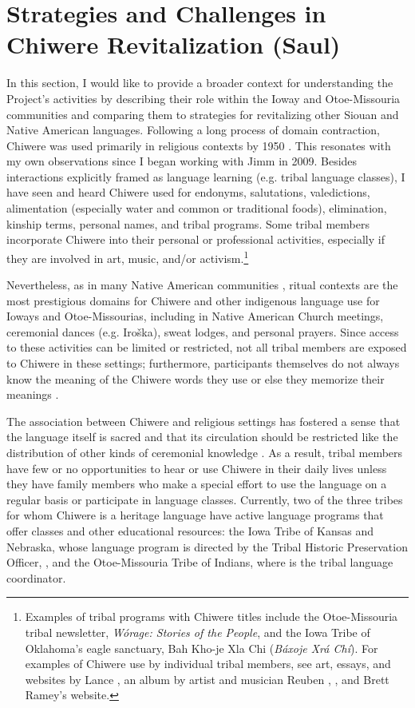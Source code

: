 \documentclass[output=paper]{LSP/langsci}
\begin{document}
\section{Strategies and Challenges in Chiwere Revitalization (Saul)}\label{saul}
In this section, I would like to provide a broader context for understanding the Project's activities by describing their role within the Ioway and Otoe-Missouria communities and comparing them to strategies for revitalizing other Siouan and Native American languages. Following a long process of domain contraction, Chiwere was used primarily in religious contexts by 1950 \citep{Davidson1997, FurbeeStanley1996, FurbeeStanley2002}. This resonates with my own observations since I began working with Jimm in 2009. Besides interactions explicitly framed as language learning (e.g. tribal language classes), I have seen and heard Chiwere used for endonyms, salutations, valedictions, alimentation (especially water and common or traditional foods), elimination, kinship terms, personal names, and tribal programs. Some tribal members incorporate Chiwere into their personal or professional activities, especially if they are involved in art, music, and/or activism.\footnote{Examples of tribal programs with Chiwere titles include the Otoe-Missouria tribal newsletter, \emph{W\'orage: Stories of the People}, and the Iowa Tribe of Oklahoma's eagle sanctuary, Bah Kho-je Xla Chi (\emph{B\'axoje Xr\'a Ch\'i}). For examples of Chiwere use by individual tribal members, see art, essays, and websites by Lance \citet{Foster1989, Foster1996, Foster1999, Foster2009, FosterNDa, FosterNDb, FosterNDc}, an album by artist and musician Reuben \citet{Kent2004}, \citet{Jones2004}, and Brett Ramey's \citeyearpar{RameyND} website.} 

Nevertheless, as in many Native American communities \citep[see e.g.][]{Kroskrity1998}, ritual contexts are the most prestigious domains for Chiwere and other indigenous language use for Ioways and Otoe-Missourias, including in Native American Church meetings, ceremonial dances (e.g. Iro\v{s}ka), sweat lodges, and personal prayers. Since access to these activities can be limited or restricted, not all tribal members are exposed to Chiwere in these settings; furthermore, participants themselves do not always know the meaning of the Chiwere words they use or else they memorize their meanings \citep[see e.g.][520--521]{Davidson1997}.

The association between Chiwere and religious settings has fostered a sense that the language itself is sacred and that its circulation should be restricted like the distribution of other kinds of ceremonial knowledge \citep{Davidson1997}. As a result, tribal members have few or no opportunities to hear or use Chiwere in their daily lives unless they have family members who make a special effort to use the language on a regular basis or participate in language classes. Currently, two of the three tribes for whom Chiwere is a heritage language have active language programs that offer classes and other educational resources: the Iowa Tribe of Kansas and Nebraska, whose language program is directed by the Tribal Historic Preservation Officer, , and the Otoe-Missouria Tribe of Indians, where  is the tribal language coordinator.
\end{document}
